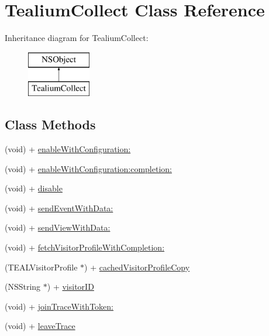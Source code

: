 \hypertarget{interface_tealium_collect}{}\section{Tealium\+Collect Class Reference}
\label{interface_tealium_collect}
Inheritance diagram for Tealium\+Collect\+:\begin{figure}[H]
\begin{center}
\leavevmode
\includegraphics[height=2.000000cm]{interface_tealium_collect}
\end{center}
\end{figure}
\subsection*{Class Methods}
\begin{DoxyCompactItemize}
\item 
(void) + \hyperlink{interface_tealium_collect_abce36b787b0f702904bd3caaab7f1338}{enable\+With\+Configuration\+:}
\item 
(void) + \hyperlink{interface_tealium_collect_af6af3f00f06c027c116e7f401923ea8f}{enable\+With\+Configuration\+:completion\+:}
\item 
(void) + \hyperlink{interface_tealium_collect_ae44d61eeee08bde059a14fedd7ccb8fe}{disable}
\item 
(void) + \hyperlink{interface_tealium_collect_a22f691ac22d7337ed409400bb150e661}{send\+Event\+With\+Data\+:}
\item 
(void) + \hyperlink{interface_tealium_collect_a32cb460af6e28d696d773356503ff01e}{send\+View\+With\+Data\+:}
\item 
(void) + \hyperlink{interface_tealium_collect_a5e5d3f690eff622edcfaa89a39bf796d}{fetch\+Visitor\+Profile\+With\+Completion\+:}
\item 
(T\+E\+A\+L\+Visitor\+Profile $\ast$) + \hyperlink{interface_tealium_collect_ae65188d3776096b4e74d2fb0de43db64}{cached\+Visitor\+Profile\+Copy}
\item 
(N\+S\+String $\ast$) + \hyperlink{interface_tealium_collect_ada7cc24d226c7ad527eedfbd238dfec1}{visitor\+I\+D}
\item 
(void) + \hyperlink{interface_tealium_collect_a35aa38b8cdfa1cecb2083988334e9075}{join\+Trace\+With\+Token\+:}
\item 
(void) + \hyperlink{interface_tealium_collect_a05aabc4900b7d0095e96a30eb62b1ed0}{leave\+Trace}
\end{DoxyCompactItemize}


